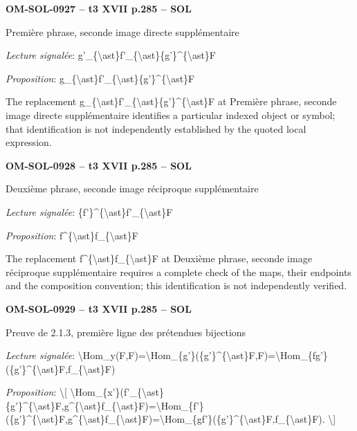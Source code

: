 \par\noindent\textbf{OM-SOL-0927 -- t3 XVII p.285 -- SOL}\par
Première phrase, seconde image directe supplémentaire\par
\emph{Lecture signalée}: g'\_\{\textbackslash{}ast\}f'\_\{\textbackslash{}ast\}\{g'\}\textasciicircum{}\{\textbackslash{}ast\}F\par
\emph{Proposition}: g\_\{\textbackslash{}ast\}f'\_\{\textbackslash{}ast\}\{g'\}\textasciicircum{}\{\textbackslash{}ast\}F\par
The replacement g\_\{\textbackslash{}ast\}f'\_\{\textbackslash{}ast\}\{g'\}\textasciicircum{}\{\textbackslash{}ast\}F at Première phrase, seconde image directe supplémentaire identifies a particular indexed object or symbol; that identification is not independently established by the quoted local expression.\par
\par\noindent\textbf{OM-SOL-0928 -- t3 XVII p.285 -- SOL}\par
Deuxième phrase, seconde image réciproque supplémentaire\par
\emph{Lecture signalée}: \{f'\}\textasciicircum{}\{\textbackslash{}ast\}f'\_\{\textbackslash{}ast\}F\par
\emph{Proposition}: f\textasciicircum{}\{\textbackslash{}ast\}f\_\{\textbackslash{}ast\}F\par
The replacement f\textasciicircum{}\{\textbackslash{}ast\}f\_\{\textbackslash{}ast\}F at Deuxième phrase, seconde image réciproque supplémentaire requires a complete check of the maps, their endpoints and the composition convention; this identification is not independently verified.\par
\par\noindent\textbf{OM-SOL-0929 -- t3 XVII p.285 -- SOL}\par
Preuve de 2.1.3, première ligne des prétendues bijections\par
\emph{Lecture signalée}: \textbackslash{}Hom\_y(F,F)=\allowbreak \textbackslash{}Hom\_\{g'\}(\{g'\}\textasciicircum{}\{\textbackslash{}ast\}F,F)=\allowbreak \textbackslash{}Hom\_\{fg'\}(\{g'\}\textasciicircum{}\{\textbackslash{}ast\}F,f\_\{\textbackslash{}ast\}F)\par
\emph{Proposition}: \textbackslash{}[ \textbackslash{}Hom\_\{x'\}(f'\_\{\textbackslash{}ast\}\{g'\}\textasciicircum{}\{\textbackslash{}ast\}F,g\textasciicircum{}\{\textbackslash{}ast\}f\_\{\textbackslash{}ast\}F)=\allowbreak \textbackslash{}Hom\_\{f'\}(\{g'\}\textasciicircum{}\{\textbackslash{}ast\}F,g\textasciicircum{}\{\textbackslash{}ast\}f\_\{\textbackslash{}ast\}F)=\allowbreak \textbackslash{}Hom\_\{gf'\}(\{g'\}\textasciicircum{}\{\textbackslash{}ast\}F,f\_\{\textbackslash{}ast\}F). \textbackslash{}]\par
